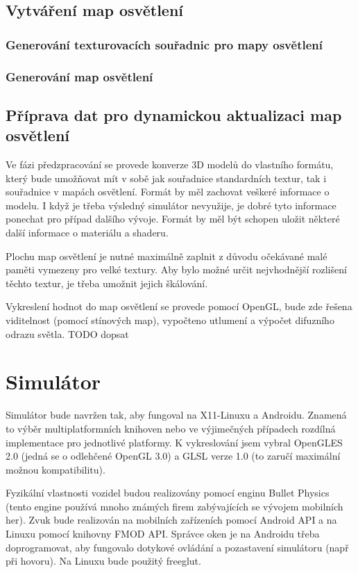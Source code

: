 \documentclass[11pt,twoside,a4paper]{book}
\begin{document}
\subsection{Vytváření map osvětlení}

\subsubsection{Generování texturovacích souřadnic pro mapy osvětlení}

\subsubsection{Generování map osvětlení}

\subsection{Příprava dat pro dynamickou aktualizaci map osvětlení}

Ve fázi předzpracování se provede konverze 3D modelů do vlastního formátu, který bude umožňovat mít v sobě jak souřadnice standardních textur, tak i souřadnice v mapách osvětlení. Formát by měl zachovat veškeré informace o modelu. I když je třeba výsledný simulátor nevyužije, je dobré tyto informace ponechat pro případ dalšího vývoje. Formát by měl být schopen uložit některé další informace o materiálu a shaderu.

Plochu map osvětlení je nutné maximálně zaplnit z důvodu očekávané malé paměti vymezeny pro velké textury. Aby bylo možné určit nejvhodnější rozlišení těchto textur, je třeba umožnit jejich škálování.

Vykreslení hodnot do map osvětlení se provede pomocí OpenGL, bude zde řešena viditelnost (pomocí stínových map), vypočteno utlumení a výpočet difuzního odrazu světla.
TODO dopsat

\section{Simulátor}
Simulátor bude navržen tak, aby fungoval na X11-Linuxu a Androidu. Znamená to výběr multiplatformních knihoven nebo ve výjimečných případech rozdílná implementace pro jednotlivé platformy. K vykreslování jsem vybral OpenGLES 2.0 (jedná se o odlehčené OpenGL 3.0) a GLSL verze 1.0 (to zaručí maximální možnou kompatibilitu).

Fyzikální vlastnosti vozidel budou realizovány pomocí enginu Bullet Physics (tento engine používá mnoho známých firem zabývajících se vývojem mobilních her). Zvuk bude realizován na mobilních zařízeních pomocí Android API a na Linuxu pomocí knihovny FMOD API. Správce oken je na Androidu třeba doprogramovat, aby fungovalo dotykové ovládání a pozastavení simulátoru (např při hovoru). Na Linuxu bude použitý freeglut.
\end{document}
